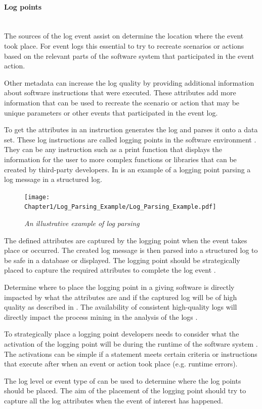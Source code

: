 \paragraph{Log points}\leavevmode\\
The sources of the log event assist on determine the location where the event took place. For event logs this essential to try to recreate scenarios or actions based on the relevant parts of the software system that participated in the event action.\par Other metadata can increase the log quality by providing additional information about software instructions that were executed. These attributes add more information that can be used to recreate the scenario or action that may be unique parameters or other events that participated in the event log.\par To get the attributes in  an instruction generates the log and parses it onto a data set. These log instructions are called logging points in the software environment \cite{Pecchia2015, Zhu2015}. They can be any instruction such as a print function that displays the information for the user to more complex functions or libraries that can be created by third-party developers. In  is an example of a logging point parsing a log message in a structured log. 

\begin{figure}[!htb]
	\centering %
	\texttt{[image: Chapter1/Log\_Parsing\_Example/Log\_Parsing\_Example.pdf]}
	\caption[An illustrative example of log parsing]
	{\textit{An illustrative example of log parsing \cite{Zhu2019}}} \label{fig:ch1_logParsing}
\end{figure}

The defined attributes are captured by the logging point when the event takes place or occurred. The created log message is then parsed into a structured log to be safe in a database or displayed. The logging point should be strategically placed to capture the required attributes to complete the log event \cite{Fedaghi2010}.\par Determine where to place the logging point in a giving software is directly impacted by what the attributes are and if the captured log will be of high quality as described in . The availability of consistent high-quality logs will directly impact the process mining in the analysis of the logs \cite{Kherbouche2017}.\par To strategically place a logging point developers needs to consider what the activation of the logging point will be during the runtime of the software system \cite{Pecchia2015, Cinque2013}. The activations can be simple if a statement meets certain criteria or instructions that execute after when an event or action took place (e.g. runtime errors). \par The log level or event type of  can be used to determine where the log points should be placed. The aim of the placement of the logging point should try to capture all the log attributes when the event of interest has happened.

